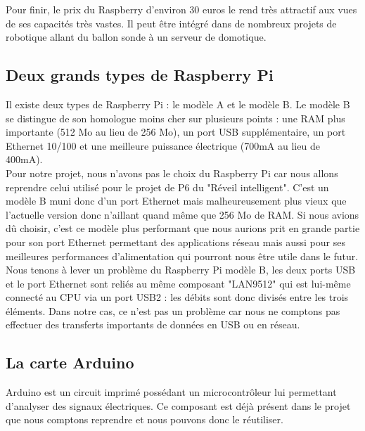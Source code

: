 Pour finir, le prix du Raspberry d'environ 30 euros le rend très attractif aux vues de ses capacités très vastes. Il peut être intégré dans de nombreux projets de robotique allant du ballon sonde à un serveur de domotique.\\

\subsection{Deux grands types de Raspberry Pi} %
\label{sub:deux_grands_types_de_raspberry_pi}
Il existe deux types de Raspberry Pi : le modèle A et le modèle B. Le modèle B se distingue de son homologue moins cher sur plusieurs points : une RAM plus importante (512 Mo au lieu de 256 Mo), un port USB supplémentaire, un port Ethernet 10/100 et une meilleure puissance électrique (700mA au lieu de 400mA). \\

Pour notre projet, nous n'avons pas le choix du Raspberry Pi car nous allons reprendre celui utilisé pour le projet de P6 du "Réveil intelligent". C'est un modèle B muni donc d'un port Ethernet mais malheureusement plus vieux que l'actuelle version donc n'aillant quand même que 256 Mo de RAM. Si nous avions dû choisir, c'est ce modèle plus performant que nous aurions prit en grande partie pour son port Ethernet permettant des applications réseau mais aussi pour ses meilleures performances d'alimentation qui pourront nous être utile dans le futur.\\

Nous tenons à lever un problème du Raspberry Pi modèle B, les deux ports USB et le port Ethernet sont reliés au même composant "LAN9512" qui est lui-même connecté au CPU via un port USB2 : les débits sont donc divisés entre les trois éléments. Dans notre cas, ce n'est pas un problème car nous ne comptons pas effectuer des transferts importants de données en USB ou en réseau.\\ 

\subsection{La carte Arduino} %
\label{sub:la_carte_arduino}
Arduino est un circuit imprimé possédant un microcontrôleur lui permettant d'analyser des signaux électriques. Ce composant est déjà présent dans le projet que nous comptons reprendre et nous pouvons donc le réutiliser. \\

